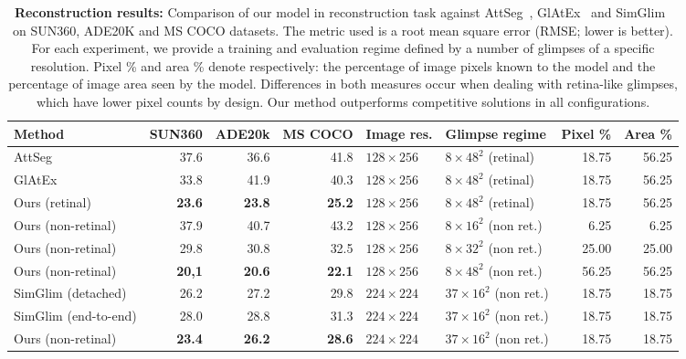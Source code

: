 \begin{table}[t]
\begin{center}
\begin{small}
\begin{sc}
\begin{tabular}{lrrrllrr}
\toprule
Method & SUN360 & ADE20k & MS COCO & Image res. & Glimpse regime & Pixel \% & Area \% \\
\midrule
AttSeg & 37.6 & 36.6 & 41.8 & $128 \times 256$ & $8 \times 48^2$ (retinal) & 18.75 & 56.25 \\
GlAtEx & 33.8 & 41.9 & 40.3 & $128 \times 256$ & $8 \times 48^2$ (retinal) & 18.75 & 56.25 \\
Ours (retinal) & \textbf{23.6} & \textbf{23.8} & \textbf{25.2} & $128 \times 256$ & $8 \times 48^2$ (retinal) & 18.75 & 56.25\\
\midrule
Ours (non-retinal) & 37.9 & 40.7 & 43.2 & $128 \times 256$ & $8 \times 16^2$ (non ret.) & 6.25 & 6.25\\
Ours (non-retinal) & 29.8 & 30.8 & 32.5 & $128 \times 256$ & $8 \times 32^2$ (non ret.) & 25.00 & 25.00\\
Ours (non-retinal) & \textbf{20,1} & \textbf{20.6} & \textbf{22.1} & $128 \times 256$ & $8 \times 48^2$ (non ret.) & 56.25 & 56.25 \\
\midrule
SimGlim (detached) & 26.2 & 27.2 & 29.8 & $224 \times 224$ & $37 \times 16^2$ (non ret.) & 18.75 & 18.75\\
SimGlim (end-to-end) & 28.0 & 28.8 & 31.3 & $224 \times 224$ & $37 \times 16^2$ (non ret.) & 18.75 & 18.75 \\
Ours (non-retinal) & \textbf{23.4} & \textbf{26.2} & \textbf{28.6} & $224 \times 224$ & $37 \times 16^2$ (non ret.) & 18.75 & 18.75 \\
\bottomrule
\end{tabular}
\end{sc}
\end{small}
\end{center}
\vskip -0.1in
\caption{\textbf{Reconstruction results:} Comparison of our model in reconstruction task against AttSeg~\protect\cite{seifi2020segment}, GlAtEx~\protect\cite{seifi2021glimpse} and SimGlim~\protect\cite{Jha2023WACV} on SUN360, ADE20K and MS COCO datasets. The metric used is a root mean square error (RMSE; lower is better). For each experiment, we provide a training and evaluation regime defined by a number of glimpses of a specific resolution. Pixel \% and area \% denote respectively: the percentage of image pixels known to the model and the percentage of image area seen by the model. Differences in both measures occur when dealing with retina-like glimpses, which have lower pixel counts by design. Our method outperforms competitive solutions in all configurations.}
\label{tab:reconstruction}
\end{table}